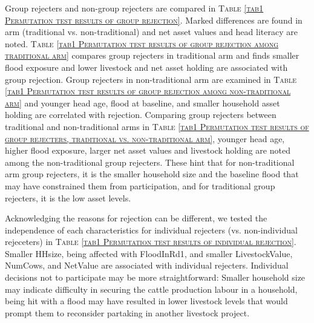 	Group rejecters and non-group rejecters are compared in \textsc{\normalsize Table \ref{tab1 Permutation test results of group rejection}}. Marked differences are found in arm (\textsf{traditional} vs. non-\textsf{traditional}) and net asset values and head literacy are noted. \textsc{\normalsize Table \ref{tab1 Permutation test results of group rejection among traditional arm}} compares group rejecters in \textsf{traditional} arm and finds smaller flood exposure and lower livestock and net asset holding are associated with group rejection. Group rejecters in non-\textsf{traditional} arm are examined in \textsc{\normalsize Table \ref{tab1 Permutation test results of group rejection among non-traditional arm}} and younger head age, flood at baseline, and smaller household asset holding are correlated with rejection. Comparing group rejecters between \textsf{traditional} and non-\textsf{traditional} arms in \textsc{\normalsize Table \ref{tab1 Permutation test results of group rejecters, traditional vs. non-traditional arm}}, younger head age, higher flood exposure, larger net asset values and livestock holding are noted among the non-\textsf{traditional} group rejecters. These hint that for non-\textsf{traditional} arm group rejecters, it is the smaller household size and the baseline flood that may have constrained them from participation, and for \textsf{traditional} group rejecters, it is the low asset levels.

	Acknowledging the reasons for rejection can be different, we tested the independence of each characteristics for individual rejecters (vs. non-individual rejeceters) in \textsc{\normalsize Table \ref{tab1 Permutation test results of individual rejection}}. Smaller \textsf{HHsize}, being affected with \textsf{FloodInRd1}, and smaller \textsf{LivestockValue}, \textsf{NumCows}, and \textsf{NetValue} are associated with individual rejecters. Individual decisions not to participate may be more straightforward: Smaller household size may indicate difficulty in securing the cattle production labour in a household, being hit with a flood may have resulted in lower livestock levels that would prompt them to reconsider partaking in another livestock project. 


